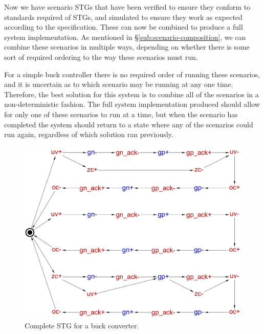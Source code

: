 \documentclass[british,compsoc]{IEEEtran}
\begin{document}

Now we have scenario STGs that have been verified to ensure they conform
to standards required of STGs, and simulated to ensure they work as
expected according to the specification. These can now be combined
to produce a full system implementation. As mentioned in \S\ref{sub:scenario-composition},
we can combine these scenarios in multiple ways, depending on whether
there is some sort of required ordering to the way these scenarios
must run.

For a simple buck controller there is no required order of running
these scenarios, and it is uncertain as to which scenario may be running
at any one time. Therefore, the best solution for this system is to
combine all of the scenarios in a non-deterministic fashion. The full
system implementation produced should allow for only one of these
scenarios to run at a time, but when the scenario has completed the
system should return to a state where any of the scenarios could run
again, regardless of which solution ran previously.

\begin{figure}[t]
\begin{centering}
\includegraphics[scale=0.22]{Images/stg-buck-scenarios_merged}
\par\end{centering}

\begin{centering}
\protect\caption{\label{fig:buck STG}Complete STG for a buck converter.}

\par\end{centering}

\end{figure}
\end{document}
